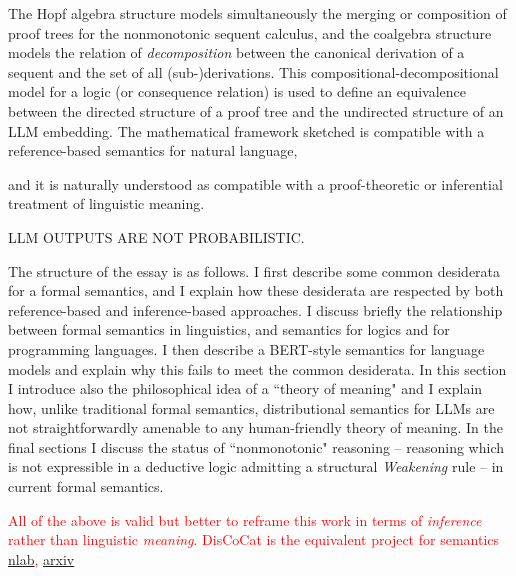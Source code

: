 \documentclass[a4paper,11pt]{report}
\begin{document}
The Hopf algebra structure models simultaneously the merging or composition of proof trees for the nonmonotonic sequent calculus, and the coalgebra structure models the relation of \emph{decomposition} between the canonical derivation of a sequent and the set of all (sub-)derivations. This compositional-decompositional model for a logic (or consequence relation) is used to define an equivalence between the directed structure of a proof tree and the undirected structure of an LLM embedding. The mathematical framework sketched is compatible with a reference-based semantics for natural language,


and it is naturally understood as compatible with a proof-theoretic or inferential treatment of linguistic meaning. 

LLM OUTPUTS ARE NOT PROBABILISTIC.


The structure of the essay is as follows. I first describe some common desiderata for a formal semantics, and I explain how these desiderata are respected by both reference-based and inference-based approaches. I discuss briefly the relationship between formal semantics in linguistics, and semantics for logics and for programming languages. I then describe a BERT-style semantics for language models and explain why this fails to meet the common desiderata. In this section I introduce also the philosophical idea of a ``theory of meaning" and I explain how, unlike traditional formal semantics, distributional semantics for LLMs are not straightforwardly amenable to any human-friendly theory of meaning. In the final sections I discuss the status of ``nonmonotonic" reasoning -- reasoning which is not expressible in a deductive logic admitting a structural \emph{Weakening} rule -- in current formal semantics. 

 \textcolor{red}{All of the above is valid but better to reframe this work in terms of \emph{inference} rather than linguistic \emph{meaning}. DisCoCat is the equivalent project for semantics \href{https://ncatlab.org/nlab/show/categorical+compositional+distributional+semantics}{nlab},  \href{https://arxiv.org/abs/1003.4394}{arxiv}}
\end{document}
